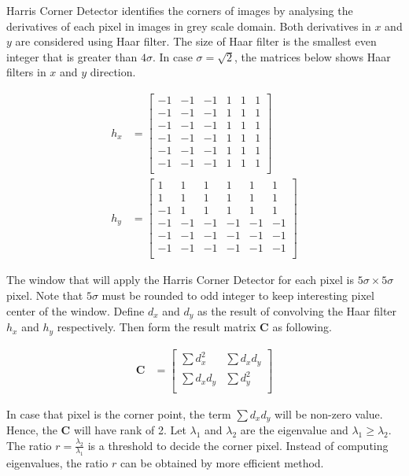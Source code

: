 \documentclass[11pt]{article}
\begin{document}
Harris Corner Detector identifies the corners of images by analysing the derivatives of each pixel in images in grey scale domain. Both derivatives in $x$ and $y$ are considered using Haar filter. The size of Haar filter is the smallest even integer that is greater than $4\sigma$. In case $\sigma = \sqrt{2}$, the matrices below shows Haar filters in $x$ and $y$ direction.

\begin{align*}
h_x & =  
\begin{bmatrix} 
-1 & -1  & -1 & 1 & 1 & 1 \\
-1 & -1  & -1 & 1 & 1 & 1 \\
-1 & -1  & -1 & 1 & 1 & 1 \\
-1 & -1  & -1 & 1 & 1 & 1 \\
-1 & -1  & -1 & 1 & 1 & 1 \\
-1 & -1  & -1 & 1 & 1 & 1 \\
\end{bmatrix}\\
h_y & =  
\begin{bmatrix} 
1 & 1  & 1 & 1 & 1 & 1 \\
1 & 1  & 1 & 1 & 1 & 1 \\
-1 & 1  & 1 & 1 & 1 & 1 \\
-1 & -1  & -1 & -1 & -1 & -1 \\
-1 & -1  & -1 & -1 & -1 & -1 \\
-1 & -1  & -1 & -1 & -1 & -1 \\
\end{bmatrix}
\end{align*}

The window that will apply the Harris Corner Detector for each pixel is $5\sigma \times 5\sigma$ pixel. Note that $5\sigma$ must be rounded to odd integer to keep interesting pixel center of the window. Define $d_x$ and $d_y$ as the result of convolving the Haar filter $h_x$ and $h_y$ respectively. Then form the result matrix $\mathbf{C}$ as following.

\begin{align*}
\mathbf{C} & =  
\begin{bmatrix} 
\sum{d^2_x} & \sum{d_x d_y}  \\
\sum{d_x d_y} & \sum{d^2_y}  \\
\end{bmatrix}
\end{align*}

In case that pixel is the corner point, the term $\sum{d_x d_y}$ will be non-zero value. Hence, the $\mathbf{C}$ will have rank of 2. Let $\lambda_1$ and $\lambda_2$ are the eigenvalue and $\lambda_1 \geq \lambda_2$. The ratio $r = \frac{\lambda_2}{\lambda_1}$ is a threshold to decide the corner pixel. Instead of computing eigenvalues, the ratio $r$ can be obtained by more efficient method. 
\end{document}
